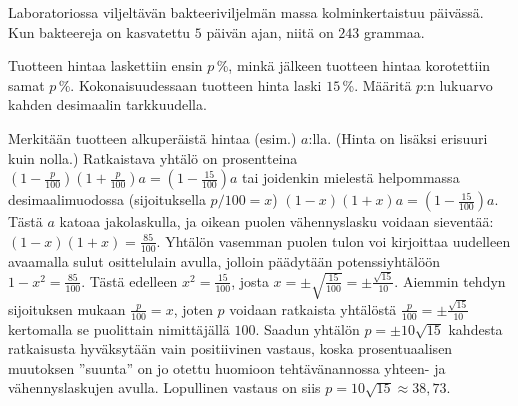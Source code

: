 \begin{multicols}{2}
\begin{tehtava}
	 Laboratoriossa viljeltävän bakteeriviljelmän massa kolminkertaistuu päivässä. Kun bakteereja on kasvatettu $5$ päivän ajan, niitä on $243$ grammaa. 
	 \begin{vastaus}
	 \end{vastaus}
\end{tehtava}

\begin{tehtava}
Tuotteen hintaa laskettiin ensin $p$\,\%, minkä jälkeen tuotteen hintaa korotettiin samat $p$\,\%. Kokonaisuudessaan tuotteen hinta laski $15$\,\%. Määritä $p$:n lukuarvo kahden desimaalin tarkkuudella.
	\begin{vastaus}
	Merkitään tuotteen alkuperäistä hintaa (esim.) $a$:lla. (Hinta on lisäksi erisuuri kuin nolla.) Ratkaistava yhtälö on prosentteina $(1-\frac{p}{100})(1+\frac{p}{100})a=(1-\frac{15}{100})a$ tai joidenkin mielestä helpommassa desimaalimuodossa (sijoituksella $p/100=x$) $(1-x)(1+x)a=(1-\frac{15}{100})a$. Tästä $a$ katoaa jakolaskulla, ja oikean puolen vähennyslasku voidaan sieventää: $(1-x)(1+x)=\frac{85}{100}$. Yhtälön vasemman puolen tulon voi kirjoittaa uudelleen avaamalla sulut osittelulain avulla, jolloin päädytään potenssiyhtälöön $1-x^2=\frac{85}{100}$. Tästä edelleen $x^2=\frac{15}{100}$, josta $x=\pm \sqrt{\frac{15}{100}}=\pm \frac{\sqrt{15}}{10}$. Aiemmin tehdyn sijoituksen mukaan $\frac{p}{100}=x$, joten $p$ voidaan ratkaista yhtälöstä $\frac{p}{100}=\pm \frac{\sqrt{15}}{10}$ kertomalla se puolittain nimittäjällä $100$. Saadun yhtälön $p=\pm 10\sqrt{15}$ kahdesta ratkaisusta hyväksytään vain positiivinen vastaus, koska prosentuaalisen muutoksen ''suunta'' on jo otettu huomioon tehtävänannossa yhteen- ja vähennyslaskujen avulla. Lopullinen vastaus on siis $p=10\sqrt{15}\approx 38,73$.
	\end{vastaus}
\end{tehtava}

\begin{tehtava}
	\begin{vastaus}
	\end{vastaus}
\end{tehtava}

\end{multicols}
\newpage